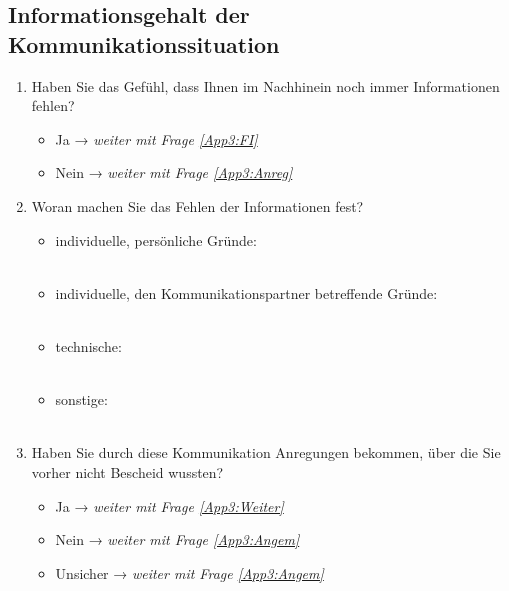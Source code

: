 \pagebreak\subsection*{Informationsgehalt der Kommunikationssituation}
\label{App3:IdS}\largerpage[-1]

\begin{enumerate}[resume]
\item Haben Sie das Gefühl, dass Ihnen im Nachhinein noch immer Informationen fehlen?

    \begin{itemize}
		\item[\Circle] Ja → \textit{weiter mit Frage \ref{App3:FI}}
        \item[\Circle] Nein → \textit{weiter mit Frage \ref{App3:Anreg}}
    \end{itemize}


\item Woran machen Sie das Fehlen der Informationen fest?\label{App3:FI}

		\begin{itemize}
		\item[\Circle] individuelle, persönliche Gründe: \\\underline{\hspace{7.5cm}}\\ 
		\item[\Circle] individuelle, den Kommunikationspartner betreffende Gründe: \\\underline{\hspace{7.5cm}}\\  
		\item[\Circle] technische: \\\underline{\hspace{7.5cm}}\\  
		\item[\Circle] sonstige: \\\underline{\hspace{7.5cm}}\\  
        \end{itemize}
           
\item Haben Sie durch diese Kommunikation Anregungen bekommen, über die Sie vorher nicht Bescheid wussten?\label{App3:Anreg}

          \begin{itemize}
           \item[\Circle] Ja → \textit{weiter mit Frage \ref{App3:Weiter}}
           \item[\Circle] Nein → \textit{weiter mit Frage \ref{App3:Angem}}
           \item[\Circle] Unsicher → \textit{weiter mit Frage \ref{App3:Angem}}
           \end{itemize}           
           
\end{enumerate}

